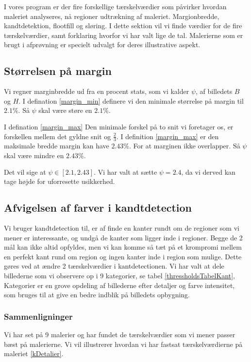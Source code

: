 {\sffamily
I vores program er der fire forskellige tærskelværdier som påvirker
hvordan maleriet analyseres, nå regioner udtrækning af maleriet.
Margionbredde, kandtdetektion, flootfill og sløring. I dette sektion vil
vi finde værdier for de fire tærskelværdier, samt forklaring hvorfor vi
har valt lige de tal. Malerierne som er brugt i afprøvning er specielt
udvalgt for deres illustrative aspekt. 
}

\subsection{Størrelsen på margin}
Vi regner marginbredde ud fra en procent stats, som vi kalder $\psi$, af
billedets $B$ og $H$. I defination \ref{margin_min} definere vi den
minimale størrelse på margin til $2.1 \%$. Så $\psi$ skal være støre en
$2.1 \%$. 

I defination \ref{margin_max}
Den minimale forskel på to snit vi foretager os, er forskellen mellem
det gyldne snit og $\frac{2}{3}$. I definition \ref{margin_max} er den
maksimale bredde margin kan have $2.43\%$. For at marginen ikke
overlapper. Så $\psi$ skal være mindre en $2.43\%$. 

Det vil sige at $\psi \in [2.1, 2.43]$. Vi har valt at
sætte $\psi = 2.4$, da vi derved kan tage højde for uforresette
usikkerhed.

\subsection{Afvigelsen af farver i kandtdetection}
Vi bruger kandtdetection til, er af finde en kanter rundt om de regioner
som vi mener er interessante, og undgå de kanter som ligger inde i
regioner. Begge de 2 mål kan ikke altid opfyldes, men vi kan komme så
tæt på et krompromi mellem en perfekt kant rund om region og ingen
kanter inde i region som mulige. Dette gøres ved at ændre 2
tærskelværdier i kantdetectionen. Vi har valt at dele billederne som vi
observere op i 9 kategorier, se tabel \ref{thressholdsTabelKant},
Kategorier er en grove opdeling af billederne efter detaljer og farve
intensitet, som bruges til at give en bedre indblik på billedets
opbygning. 

\subsubsection{Sammenligninger}
Vi har set på 9 malerier og har fundet de tærskelværdier som vi mener
passer bæst på malerierne. Vi vil illustrerer hvordan vi har fastsat
tærskelværdierne på maleriet \ref{kDetalier}.

